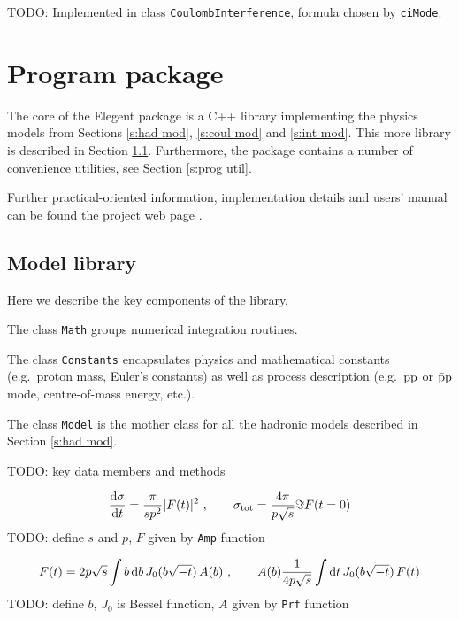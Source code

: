 \documentclass[preprint,12pt]{elsarticle}
\def\d{{\rm d}}
\begin{document}
TODO: Implemented in class {\tt CoulombInterference}, formula chosen by {\tt ciMode}.


\section{Program package}\label{s:prog}

The core of the Elegent package is a C++ library implementing the physics models from Sections \ref{s:had mod}, \ref{s:coul mod} and \ref{s:int mod}. This more library is described in Section \ref{s:prog lib}. Furthermore, the package contains a number of convenience utilities, see Section \ref{s:prog util}.

Further practical-oriented information, implementation details and users' manual can be found the project web page \cite{elegent}.

\subsection{Model library}\label{s:prog lib} 

Here we describe the key components of the library.

The class {\tt Math} groups numerical integration routines.

The class {\tt Constants} encapsulates physics and mathematical constants (e.g.~proton mass, Euler's constants) as well as process description (e.g.~$\rm pp$ or $\rm \bar pp$ mode, centre-of-mass energy, etc.).

The class {\tt Model} is the mother class for all the hadronic models described in Section \ref{s:had mod}. 

TODO: key data members and methods


\begin{equation}
{\d\sigma\over\d t} = {\pi\over s p^2} |F(t)|^2\ ,\qquad \sigma_{\rm tot} = {4\pi\over p\sqrt s} \Im F(t = 0)
\end{equation}
TODO: define $s$ and $p$, $F$ given by {\tt Amp} function

\begin{equation}
F(t) = 2 p \sqrt s \int b\, \d b\, J_0(b \sqrt{-t})\, A(b)\ ,\qquad A(b) {1\over 4p\sqrt s} \int \d t\, J_0(b\sqrt{-t})\,F(t)
\end{equation}
TODO: define $b$, $J_0$ is Bessel function, $A$ given by {\tt Prf} function
\end{document}
